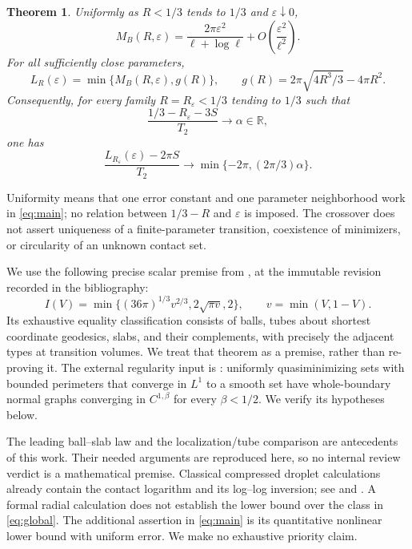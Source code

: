 \documentclass[11pt]{article}
\newcommand{\R}{\mathbb R}
\newcommand{\eps}{\varepsilon}
\newtheorem{theorem}{Theorem}[section]
\theoremstyle{remark}\newtheorem{remark}[theorem]{Remark}
\numberwithin{equation}{section}
\begin{document}
\begin{theorem}\label{thm:main}
Uniformly as $R<1/3$ tends to $1/3$ and $\eps\downarrow0$,
\begin{equation}
 M_B(R,\eps)=\frac{2\pi\eps^2}{\ell+\log\ell}
                   +O\left(\frac{\eps^2}{\ell^2}\right).
 \label{eq:main}
\end{equation}
For all sufficiently close parameters,
\begin{equation}
 L_R(\eps)=\min\{M_B(R,\eps),g(R)\},\qquad
 g(R)=2\pi\sqrt{4R^3/3}-4\pi R^2.\label{eq:two-well}
\end{equation}
Consequently, for every family $R=R_\eps<1/3$ tending to $1/3$ such that
\[
 \frac{1/3-R_\eps-3S}{T_2}\longrightarrow\alpha\in\R,
\]
one has
\begin{equation}
 \frac{L_{R_\eps}(\eps)-2\pi S}{T_2}
 \longrightarrow\min\{-2\pi,(2\pi/3)\alpha\}.
 \label{eq:crossover}
\end{equation}
\end{theorem}
Uniformity means that one error constant and one parameter neighborhood
work in \eqref{eq:main}; no relation between $1/3-R$ and $\eps$ is imposed.
The crossover does not assert uniqueness of a finite-parameter transition,
coexistence of minimizers, or circularity of an unknown contact set.

We use the following precise scalar premise from \cite[Theorem 1.1,
label \texttt{intro:main}]{OpenAI}, at the immutable revision recorded
in the bibliography:
\begin{equation}
 I(V)=\min\{(36\pi)^{1/3}v^{2/3},2\sqrt{\pi v},2\},
 \qquad v=\min(V,1-V).\label{eq:profile}
\end{equation}
Its exhaustive equality classification consists of balls, tubes about
shortest coordinate geodesics, slabs, and their complements, with precisely
the adjacent types at transition volumes. We treat that theorem as a
premise, rather than re-proving it. The external regularity input is
\cite[Definition 2.5 and Theorem 4.2]{AFM}: uniformly quasiminimizing sets
with bounded perimeters that converge in $L^1$ to a smooth set have
whole-boundary normal graphs converging in $C^{1,\beta}$ for every
$\beta<1/2$. We verify its hypotheses below.

The leading ball--slab law and the localization/tube comparison are
antecedents of this work. Their needed arguments are reproduced here, so
no internal review verdict is a mathematical premise. Classical compressed
droplet calculations already contain the contact logarithm and its
log--log inversion; see \cite[Section III]{LGL} and
\cite[Sections 4.1--4.2 and Appendix B.2]{Lv}. A formal radial calculation
does not establish the lower bound over the class in \eqref{eq:global}.
The additional assertion in \eqref{eq:main} is its quantitative nonlinear
lower bound with uniform error. We make no exhaustive priority claim.
\end{document}
